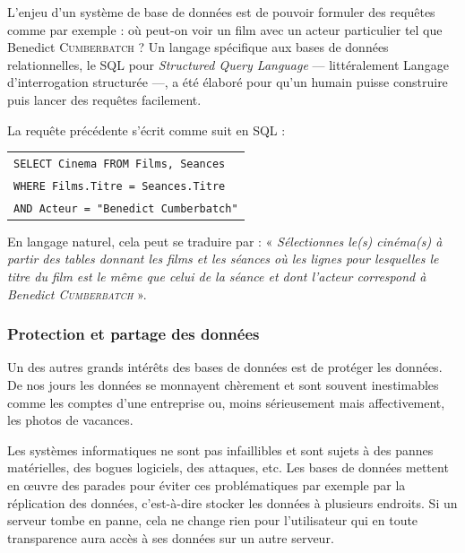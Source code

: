 L'enjeu d'un système de base de données est de pouvoir formuler des requêtes comme par exemple : où peut-on voir un film avec un acteur particulier tel que Benedict \textsc{Cumberbatch} ? Un langage spécifique aux bases de données relationnelles, le SQL pour \textit{Structured Query Language} --- littéralement Langage d'interrogation structurée ---, a été élaboré pour qu'un humain puisse construire puis lancer des requêtes facilement.

La requête précédente s'écrit comme suit en SQL :

\begin{tabular}[t]{@{}l@{}}
\texttt{SELECT Cinema FROM Films, Seances}\\
\texttt{\space WHERE Films.Titre = Seances.Titre}  \\ %
\texttt{\space\space\space AND Acteur = "Benedict Cumberbatch"} \\ %
\end{tabular}

En langage naturel, cela peut se traduire par : « \textit{Sélectionnes le(s) cinéma(s) à partir des tables donnant les films et les séances où les lignes pour lesquelles le titre du film est le même que celui de la séance et dont l'acteur correspond à Benedict \textsc{Cumberbatch}} ».


\subsubsection[Protection et partage]{Protection et partage des données}
\label{subsub:V.3.3.2}

Un des autres grands intérêts des bases de données est de protéger les données. De nos jours les données se monnayent chèrement et sont souvent inestimables comme les comptes d'une entreprise ou, moins sérieusement mais affectivement, les photos de vacances.

Les systèmes informatiques ne sont pas infaillibles et sont sujets à des pannes matérielles, des bogues logiciels, des attaques, etc. Les bases de données mettent en œuvre des parades pour éviter ces problématiques par exemple par la réplication des données, c'est-à-dire stocker les données à plusieurs endroits. Si un serveur tombe en panne, cela ne change rien pour l'utilisateur qui en toute transparence aura accès à ses données sur un autre serveur.

